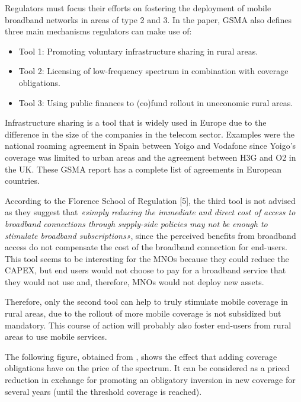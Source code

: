 Regulators must focus their efforts on fostering the deployment of mobile broadband networks in areas of type 2 and 3. In the paper, GSMA also defines three main mechanisms regulators can make use of:\par

\begin{itemize}
	\item Tool 1: Promoting voluntary infrastructure sharing in rural areas.\par

	\item Tool 2: Licensing of low-frequency spectrum in combination with coverage obligations.\par

	\item Tool 3: Using public finances to (co)fund rollout in uneconomic rural areas.
\end{itemize}\par

Infrastructure sharing is a tool that is widely used in Europe due to the difference in the size of the companies in the telecom sector. Examples were the national roaming agreement in Spain between Yoigo and Vodafone since Yoigo’s coverage was limited to urban areas and the agreement between H3G and O2 in the UK. These GSMA report \cite{2-04} has a complete list of agreements in European countries.\par

According to the Florence School of Regulation [5], the third tool is not advised as they suggest that \textit{«simply reducing the immediate and direct cost of access to broadband connections through supply-side policies may not be enough to stimulate broadband subscriptions»}, since the perceived benefits from broadband access do not compensate the cost of the broadband connection for end-users. This tool seems to be interesting for the MNOs because they could reduce the CAPEX, but end users would not choose to pay for a broadband service that they would not use and, therefore, MNOs would not deploy new assets. \par

Therefore, only the second tool can help to truly stimulate mobile coverage in rural areas, due to the rollout of more mobile coverage is not subsidized but mandatory. This course of action will probably also foster end-users from rural areas to use mobile services.\par

The following figure, obtained from \cite{2-03}, shows the effect that adding coverage obligations have on the price of the spectrum. It can be considered as a priced reduction in exchange for promoting an obligatory inversion in new coverage for several years (until the threshold coverage is reached).

